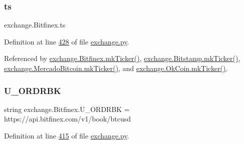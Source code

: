 \mbox{\label{classexchange_1_1_bitfinex_abf872e8ea738acd33d34a00d9d9e92c4}} 
\subsubsection{\texorpdfstring{ts}{ts}}
{\footnotesize\ttfamily exchange.\+Bitfinex.\+ts}



Definition at line \hyperlink{exchange_8py_source_l00428}{428} of file \hyperlink{exchange_8py_source}{exchange.\+py}.



Referenced by \hyperlink{exchange_8py_source_l00453}{exchange.\+Bitfinex.\+mk\+Ticker()}, \hyperlink{exchange_8py_source_l00525}{exchange.\+Bitstamp.\+mk\+Ticker()}, \hyperlink{exchange_8py_source_l00665}{exchange.\+Mercado\+Bitcoin.\+mk\+Ticker()}, and \hyperlink{exchange_8py_source_l00730}{exchange.\+Ok\+Coin.\+mk\+Ticker()}.

\mbox{\label{classexchange_1_1_bitfinex_a81c1548dbbb9caacf43e8a6a6e8be3a4}} 
\subsubsection{\texorpdfstring{U\+\_\+\+O\+R\+D\+R\+BK}{U\_ORDRBK}}
{\footnotesize\ttfamily string exchange.\+Bitfinex.\+U\+\_\+\+O\+R\+D\+R\+BK = \textquotesingle{}https\+://api.\+bitfinex.\+com/v1/book/btcusd\textquotesingle{}\hspace{0.3cm}{\ttfamily [static]}}



Definition at line \hyperlink{exchange_8py_source_l00415}{415} of file \hyperlink{exchange_8py_source}{exchange.\+py}.

\mbox{\label{classexchange_1_1_bitfinex_a2980dc6a7a3d6a4391ba0b2fbadfacee}} 
